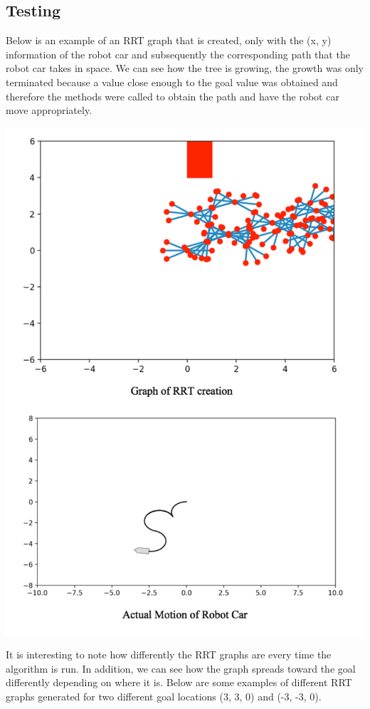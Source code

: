 \documentclass{article}
\begin{document}
\subsection{Testing}

Below is an example of an RRT graph that is created, only with the (x, y) information of the robot car and subsequently the corresponding path that the robot car takes in space. We can see how the tree is growing, the growth was only terminated because a value close enough to the goal value was obtained and therefore the methods were called to obtain the path and have the robot car move appropriately.  

\includegraphics[width=\textwidth]{simple_rrt_example.pdf}

It is interesting to note how differently the RRT graphs are every time the algorithm is run. In addition, we can see how the graph spreads toward the goal differently depending on where it is. Below are some examples of different RRT graphs generated for two different goal locations (3, 3, 0) and (-3, -3, 0). 
\end{document}
